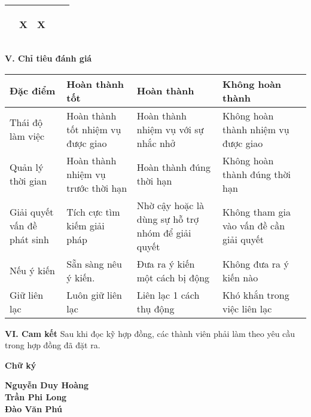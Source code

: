 \documentclass{article}
\begin{document}
\begin{flushleft}
\begin{tabular}{|>{\raggedright\arraybackslash}p{3cm}| >{\raggedright\arraybackslash}p{3cm}|
>{\raggedright\arraybackslash}p{3cm}|
>{\raggedright\arraybackslash}p{3cm}|
>{\raggedright\arraybackslash}p{3cm}|}
\begin{center}
        \end{center} & \begin{center}
            X
        \end{center} & \begin{center}
            X
        \end{center}
        \\
    \hline
\end{tabular}
\textbf{\large V. Chỉ tiêu đánh giá}
\begin{tabular}{|>{\raggedright\arraybackslash}p{4cm}
|>{\raggedright\arraybackslash}p{4cm}
|>{\raggedright\arraybackslash}p{4cm}
|>{\raggedright\arraybackslash}p{4cm}
|>{\raggedright\arraybackslash}p{4cm}|}
    \hline
        Đặc điểm
        & Hoàn thành tốt
        & Hoàn thành
        & Không hoàn thành\\
    \hline
        Thái độ làm việc
        & Hoàn thành tốt nhiệm vụ được giao
        & Hoàn thành nhiệm vụ với sự nhắc nhở
        & Không hoàn thành nhiệm vụ được giao\\
    \hline
        Quản lý thời gian
        & Hoàn thành nhiệm vụ trước thời hạn
        & Hoàn thành đúng thời hạn
        & Không hoàn thành đúng thời hạn
        \\
    \hline
        Giải quyết vấn đề phát sinh
        & Tích cực tìm kiếm giải pháp
        & Nhờ cậy hoặc là dùng sự hỗ trợ nhóm để giải quyết
        & Không tham gia vào vấn đề cần giải quyết
        \\
    \hline
        Nếu ý kiến
        & Sẵn sàng nêu ý kiến.
        & Đưa ra ý kiến một cách bị động
        & Không đưa ra ý kiến nào
        \\
    \hline
        Giữ liên lạc
        & Luôn giữ liên lạc
        & Liên lạc 1 cách thụ động
        & Khó khắn trong việc liên lạc
        \\
    \hline
        
\end{tabular}
\textbf{\large VI. Cam kết}
Sau khi đọc kỹ hợp đồng, các thành viên phải làm theo yêu cầu trong hợp đồng đã đặt ra.
\newpage
\begin{center}
    \textbf{\Large Chữ ký}
\end{center}
\textbf{Nguyễn Duy Hoàng}\\
\textbf{Trần Phi Long}\\
\textbf{Đào Văn Phú}
\end{flushleft}
\end{document}
